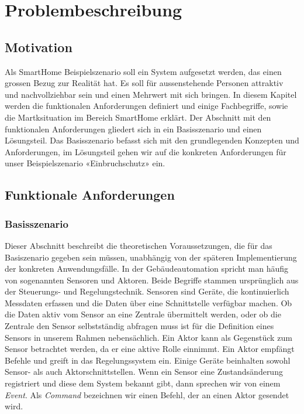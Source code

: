 \section{Problembeschreibung}

\subsection{Motivation}
Als SmartHome Beispielszenario soll ein System aufgesetzt werden, das einen grossen Bezug zur Realität hat. Es soll für aussenstehende Personen attraktiv und nachvollziehbar sein und einen Mehrwert mit sich bringen. In diesem Kapitel werden die funktionalen Anforderungen definiert und einige Fachbegriffe, sowie die Martksituation im Bereich SmartHome erklärt. Der Abschnitt mit den funktionalen Anforderungen gliedert sich in ein Basisszenario und einen Lösungsteil. Das Basisszenario befasst sich mit den grundlegenden Konzepten und Anforderungen, im Lösungsteil gehen wir auf die konkreten Anforderungen für unser Beispielszenario «Einbruchschutz» ein.


\subsection{Funktionale Anforderungen}
\subsubsection{Basisszenario}
Dieser Abschnitt beschreibt die theoretischen Voraussetzungen, die für das Basiszenario gegeben sein müssen, unabhängig von der späteren Implementierung der konkreten Anwendungsfälle.
In der Gebäudeautomation spricht man häufig von sogenannten Sensoren und Aktoren. Beide Begriffe stammen ursprünglich aus der Steuerungs- und Regelungstechnik. Sensoren sind Geräte, die kontinuierlich Messdaten erfassen und die Daten über eine Schnittstelle verfügbar machen. Ob die Daten aktiv vom Sensor an eine Zentrale übermittelt werden, oder ob die Zentrale den Sensor selbstständig abfragen muss ist für die Definition eines Sensors in unserem Rahmen nebensächlich. Ein Aktor kann als Gegenstück zum Sensor betrachtet werden, da er eine aktive Rolle einnimmt. Ein Aktor empfängt Befehle und greift in das Regelungssystem ein. Einige Geräte beinhalten sowohl Sensor- als auch Aktorschnittstellen. Wenn ein Sensor eine Zustandsänderung registriert und diese dem System bekannt gibt, dann sprechen wir von einem \textit{Event}. Als \textit{Command} bezeichnen wir einen Befehl, der an einen Aktor gesendet wird.

